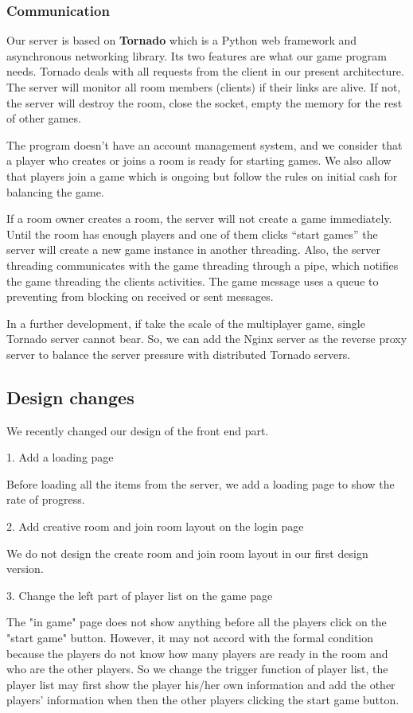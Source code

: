 \documentclass[a4paper,11pt]{article}
\begin{document}
\subsubsection{Communication}
Our server is based on \textbf{Tornado} which is a Python web framework and asynchronous networking library. Its two features are what our game program needs. Tornado deals with all requests from the client in our present architecture. The server will monitor all room members (clients) if their links are alive. If not, the server will destroy the room, close the socket, empty the memory for the rest of other games. 

The program doesn't have an account management system, and we consider that a player who creates or joins a room is ready for starting games. We also allow that players join a game which is ongoing but follow the rules on initial cash for balancing the game.

If a room owner creates a room, the server will not create a game immediately. Until the room has enough players and one of them clicks “start games” the server will create a new game instance in another threading. Also, the server threading communicates with the game threading through a pipe, which notifies the game threading the clients activities. The game message uses a queue to preventing from blocking on received or sent messages.

In a further development, if take the scale of the multiplayer game, single Tornado server cannot bear. So, we can add the Nginx server as the reverse proxy server to balance the server pressure with distributed Tornado servers.
\subsection{Design changes}
We recently changed our design of the front end part.

1.	Add a loading page

    Before loading all the items from the server, we add a loading page to show the rate of progress.

2.	Add creative room and join room layout on the login page

    We do not design the create room and join room layout in our first design version. 

3.	Change the left part of player list on the game page

    The "in game" page does not show anything before all the players click on the "start game" button. However, it may not accord with the formal condition because the players do not know how many players are ready in the room and who are the other players. So we change the trigger function of player list, the player list may first show the player his/her own information and add the other players' information when then the other players clicking the start game button. 
\end{document}

